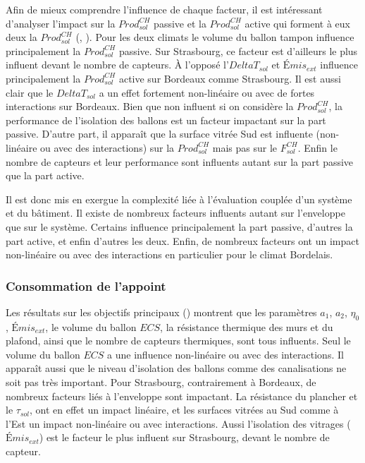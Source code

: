 Afin de mieux comprendre l’influence de chaque facteur, il est intéressant d’analyser
l’impact sur la $Prod_{sol}^{CH}$ passive et la $Prod_{sol}^{CH}$ active qui forment à eux
deux la $Prod_{sol}^{CH}$ (, ).
Pour les deux climats le volume du ballon tampon influence principalement la
$Prod_{sol}^{CH}$ passive. Sur Strasbourg, ce facteur est d’ailleurs le plus influent
devant le nombre de capteurs. À l’opposé l’$DeltaT_{sol}$ et $Émis_{ext}$ influence
principalement la $Prod_{sol}^{CH}$ active sur Bordeaux comme Strasbourg. Il est aussi
clair que le $DeltaT_{sol}$ a un effet fortement non-linéaire ou avec de fortes
interactions sur Bordeaux. Bien que non influent si on considère la $Prod_{sol}^{CH}$, la
performance de l’isolation des ballons est un facteur impactant sur la part passive.
D’autre part, il apparaît que la surface vitrée Sud est influente (non- linéaire ou avec
des interactions) sur la $Prod_{sol}^{CH}$ mais pas sur le $F_{sol}^{CH}$. Enfin le nombre
de capteurs et leur performance sont influents autant sur la part passive que la part
active.

Il est donc mis en exergue la complexité liée à l’évaluation couplée d’un système
et du bâtiment. Il existe de nombreux facteurs influents autant sur l’enveloppe que
sur le système. Certains influence principalement la part passive, d’autres la part
active, et enfin d’autres les deux. Enfin, de nombreux facteurs ont un impact non-linéaire
ou avec des interactions en particulier pour le climat Bordelais.

\subsubsection{Consommation de l’appoint} %
\label{ssub:consommation_de_l_appoint}
Les résultats sur les objectifs principaux () montrent que
les paramètres $a_{1}$, $a_{2}$, $\eta_{0}$, $Émis_{ext}$, le volume du ballon $ECS$, la
résistance thermique des murs et du plafond, ainsi que le nombre de capteurs thermiques,
sont tous influents. Seul le volume du ballon $ECS$ a une influence non-linéaire ou avec
des interactions. Il apparaît aussi que le niveau d’isolation des ballons comme des
canalisations ne soit pas très important. Pour Strasbourg, contrairement à Bordeaux, de
nombreux facteurs liés à l’enveloppe sont impactant. La résistance du plancher et le
$\tau_{sol}$, ont en effet un impact linéaire, et les surfaces vitrées au Sud comme à
l’Est un impact non-linéaire ou avec interactions. Aussi l’isolation des vitrages
($Émis_{ext}$) est le facteur le plus influent sur Strasbourg, devant le nombre de
capteur.

